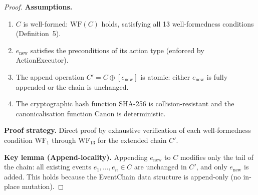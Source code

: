 \begin{proof}
\textbf{Assumptions.}
\begin{enumerate}[label=(A\arabic*),leftmargin=2em]
    \item $C$ is well-formed: $\text{WF}(C)$ holds, satisfying all 13 well-formedness conditions (Definition~5).
    \item $e_{\text{new}}$ satisfies the preconditions of its action type (enforced by ActionExecutor).
    \item The append operation $C' = C \oplus [e_{\text{new}}]$ is atomic: either $e_{\text{new}}$ is fully appended or the chain is unchanged.
    \item The cryptographic hash function SHA-256 is collision-resistant and the canonicalisation function $\text{Canon}$ is deterministic.
\end{enumerate}

\textbf{Proof strategy.} Direct proof by exhaustive verification of each well-formedness condition $\text{WF}_1$ through $\text{WF}_{13}$ for the extended chain $C'$.

\textbf{Key lemma (Append-locality).} Appending $e_{\text{new}}$ to $C$ modifies only the tail of the chain: all existing events $e_1, \ldots, e_n \in C$ are unchanged in $C'$, and only $e_{\text{new}}$ is added. This holds because the EventChain data structure is append-only (no in-place mutation).


\end{proof}
